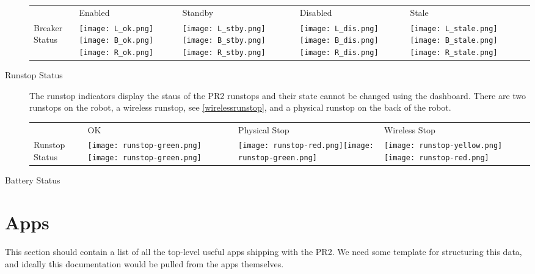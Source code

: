 \begin{description}
    \begin{tabular}{m{2.6cm}SSSS}
     & Enabled & Standby & Disabled & Stale\\
    Breaker Status & \texttt{[image: L\_ok.png]}\texttt{[image: B\_ok.png]}\texttt{[image: R\_ok.png]}&
                     \texttt{[image: L\_stby.png]}\texttt{[image: B\_stby.png]}\texttt{[image: R\_stby.png]}&
                     \texttt{[image: L\_dis.png]}\texttt{[image: B\_dis.png]}\texttt{[image: R\_dis.png]}&
                     \texttt{[image: L\_stale.png]}\texttt{[image: B\_stale.png]}\texttt{[image: R\_stale.png]}\\
   \end{tabular}



\item[Runstop Status] The runstop indicators display the staus of the PR2 runstops and their state cannot be changed using the dashboard. 
There are two runstops on the robot, a wireless runstop, see \ref{wirelessrunstop}, and a physical runstop on the back of the robot.\\

    \begin{tabular}{m{2.6cm}SSS}
     & OK & Physical Stop & Wireless Stop\\
    Runstop Status & \texttt{[image: runstop-green.png]}\texttt{[image: runstop-green.png]}&
                     \texttt{[image: runstop-red.png]}\texttt{[image: runstop-green.png]}&
                     \texttt{[image: runstop-yellow.png]}\texttt{[image: runstop-red.png]}\\
   \end{tabular}


\item[Battery Status]

\end{description}

\section{Apps}
This section should contain a list of all the top-level useful apps shipping with the PR2.  We need some template for structuring this data, and ideally this documentation would be pulled from the apps themselves.

